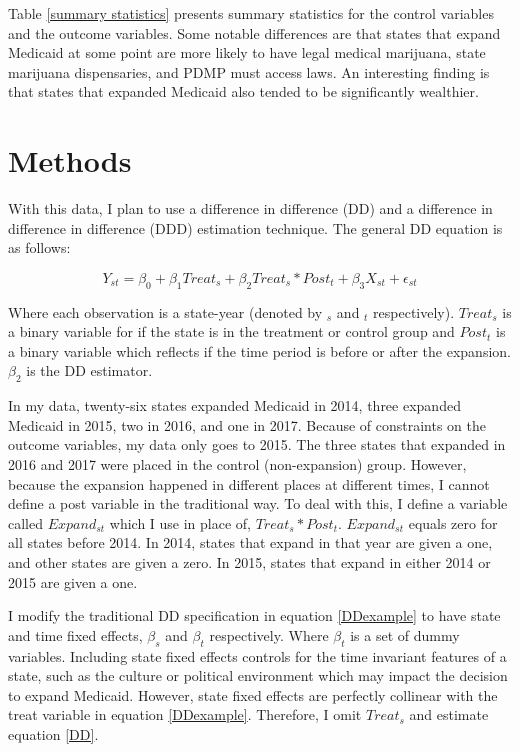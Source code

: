 \documentclass[11pt]{article}
\begin{document}
\cleardoublepage

Table \ref{summary statistics} presents summary statistics for the control variables and the outcome variables.  Some notable differences are that states that expand Medicaid at some point are more likely to have legal medical marijuana, state marijuana dispensaries, and PDMP must access laws. An interesting finding is that states that expanded Medicaid also tended to be significantly wealthier.       

\section{Methods}
With this data, I plan to use a difference in difference (DD) and a difference in difference in difference (DDD) estimation technique. The general DD equation is as follows:

\begin{equation}
    Y_{st}=\beta_0+\beta_1Treat_s+ \beta_2 Treat_s*Post_t+\beta_3 X_{st} + \epsilon_{st}
     \label{DDexample}
\end{equation}


Where each observation is a state-year (denoted by $_s$ and $_t$ respectively).  $Treat_s$ is a binary variable for if the state is in the treatment or control group and $Post_t$ is a binary variable which reflects if the time period is before or after the expansion.  $\beta_2$ is the DD estimator.  

In my data, twenty-six states expanded Medicaid in 2014, three expanded Medicaid in 2015, two in 2016, and one in 2017. Because of constraints on the outcome variables, my data only goes to 2015.  The three states that expanded in 2016 and 2017 were placed in the control (non-expansion) group.  However, because the expansion happened in different places at different times, I cannot define a post variable in the traditional way.  To deal with this, I define a variable called $Expand_{st}$ which I use in place of, $Treat_s*Post_t$.  $Expand_{st}$ equals zero for all states before 2014.  In 2014, states that expand in that year are given a one, and other states are given a zero.  In 2015, states that expand in either 2014 or 2015 are given a one.        


I modify the traditional DD specification in equation \ref{DDexample} to have state and time fixed effects, $\beta_s$ and $\beta_t$ respectively. Where $\beta_t$ is a set of dummy variables.  Including state fixed effects controls for the time invariant features of a state, such as the culture or political environment which may impact the decision to expand Medicaid.  However, state fixed effects are perfectly collinear with the treat variable in equation \ref{DDexample}.  Therefore, I omit $Treat_s$ and estimate equation \ref{DD}.
\end{document}
